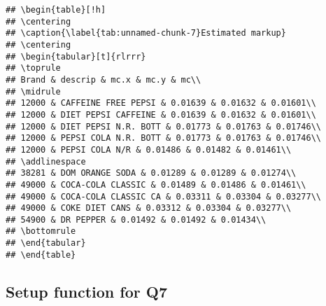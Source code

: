 \documentclass[
]{article}
\begin{document}
\begin{verbatim}
## \begin{table}[!h]
## \centering
## \caption{\label{tab:unnamed-chunk-7}Estimated markup}
## \centering
## \begin{tabular}[t]{rlrrr}
## \toprule
## Brand & descrip & mc.x & mc.y & mc\\
## \midrule
## 12000 & CAFFEINE FREE PEPSI & 0.01639 & 0.01632 & 0.01601\\
## 12000 & DIET PEPSI CAFFEINE & 0.01639 & 0.01632 & 0.01601\\
## 12000 & DIET PEPSI N.R. BOTT & 0.01773 & 0.01763 & 0.01746\\
## 12000 & PEPSI COLA N.R. BOTT & 0.01773 & 0.01763 & 0.01746\\
## 12000 & PEPSI COLA N/R & 0.01486 & 0.01482 & 0.01461\\
## \addlinespace
## 38281 & DOM ORANGE SODA & 0.01289 & 0.01289 & 0.01274\\
## 49000 & COCA-COLA CLASSIC & 0.01489 & 0.01486 & 0.01461\\
## 49000 & COCA-COLA CLASSIC CA & 0.03311 & 0.03304 & 0.03277\\
## 49000 & COKE DIET CANS & 0.03312 & 0.03304 & 0.03277\\
## 54900 & DR PEPPER & 0.01492 & 0.01492 & 0.01434\\
## \bottomrule
## \end{tabular}
## \end{table}
\end{verbatim}

\hypertarget{setup-function-for-q7}{%
\subsection{Setup function for Q7}\label{setup-function-for-q7}}
\end{document}
